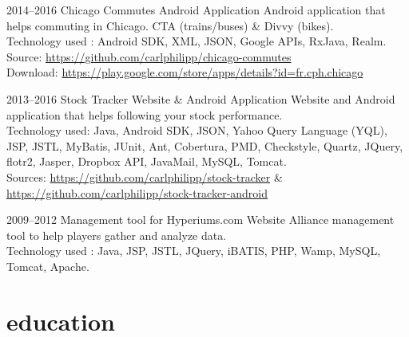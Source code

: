 \documentclass[]{friggeri-cv} %
\begin{document}
\begin{entrylist}

\entry
{2014--2016}
{Chicago Commutes}
{  Android Application}
{}
{Android application that helps commuting in Chicago. CTA (trains/buses) \& Divvy (bikes).\\
Technology used : Android SDK, XML, JSON, Google APIs, RxJava, Realm.\\
\footnotesize{Source: \href{https://github.com/carlphilipp/chicago-commutes}{https://github.com/carlphilipp/chicago-commutes}}\\
\footnotesize{Download: \href{https://play.google.com/store/apps/details?id=fr.cph.chicago}{https://play.google.com/store/apps/details?id=fr.cph.chicago}}}

\end{entrylist}

\begin{entrylist}

\entry
{2013--2016}
{Stock Tracker}
{  Website \& Android Application}
{}
{Website and Android application that helps following your stock performance.\\
Technology used: Java, Android SDK, JSON, Yahoo Query Language (YQL), JSP, JSTL, MyBatis,
JUnit, Ant, Cobertura, PMD, Checkstyle, Quartz, JQuery, flotr2, Jasper, Dropbox API, JavaMail,
MySQL, Tomcat.\\
\footnotesize{Sources: \href{https://github.com/carlphilipp/stock-tracker}{https://github.com/carlphilipp/stock-tracker} \& \href{https://github.com/carlphilipp/stock-tracker}{https://github.com/carlphilipp/stock-tracker-android}}}

\end{entrylist}

\begin{entrylist}

\entry
{2009--2012}
{Management tool for Hyperiums.com}
{Website}
{}
{Alliance management tool to help players gather and analyze data.\\
Technology used : Java, JSP, JSTL, JQuery, iBATIS, PHP, Wamp, MySQL, Tomcat, Apache.}

\end{entrylist}


\section{education}
\end{document}
